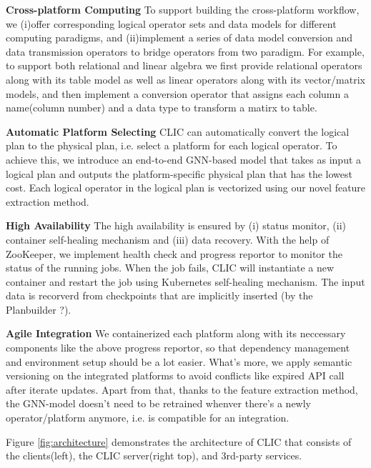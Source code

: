 \textbf{Cross-platform Computing}        To support building the cross-platform workflow, we (i)offer corresponding logical operator sets and data models for different computing paradigms, and (ii)implement a series of data model conversion and data transmission operators to bridge operators from two paradigm. For example, to support both relational and linear algebra we first provide relational operators along with its table model as well as linear operators along with its vector/matrix models, and then implement a conversion operator that assigns each column a name(column number) and a data type to transform a matirx to table.

\textbf{Automatic Platform Selecting}    CLIC can automatically convert the logical plan to the physical plan, i.e. select a platform for each logical operator. To achieve this, we introduce an end-to-end GNN-based model that takes as input a logical plan and outputs the platform-specific physical plan that has the lowest cost. Each logical operator in the logical plan is vectorized using our novel feature extraction method.

\textbf{High Availability}               The high availability is ensured by (i) status monitor, (ii) container self-healing mechanism and (iii) data recovery. With the help of ZooKeeper, we implement health check and progress reportor to monitor the status of the running jobs. When the job fails, CLIC will instantiate a new container and restart the job using Kubernetes self-healing mechanism. The input data is recorverd from checkpoints that are implicitly inserted (by the Planbuilder ?).

\textbf{Agile Integration}               We containerized each platform along with its neccessary components like the above progress reportor, so that dependency management and environment setup should be a lot easier. What's more, we apply semantic versioning on the integrated platforms to avoid conflicts like expired API call after iterate updates. Apart from that, thanks to the feature extraction method, the GNN-model doesn't need to be retrained whenver there's a newly operator/platform anymore, i.e. is compatible for an integration.

Figure \ref{fig:architecture} demonstrates the architecture of CLIC that consists of the clients(left), the CLIC server(right top), and 3rd-party services.

